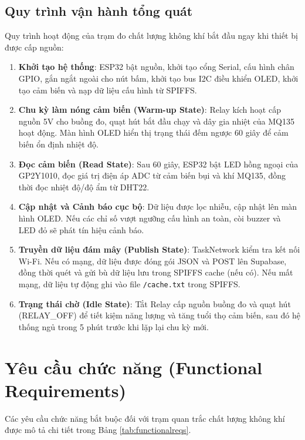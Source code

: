 \subsection{Quy trình vận hành tổng quát}
Quy trình hoạt động của trạm đo chất lượng không khí bắt đầu ngay khi thiết bị được cấp nguồn:
\begin{enumerate}
    \item \textbf{Khởi tạo hệ thống}: ESP32 bật nguồn, khởi tạo cổng Serial, cấu hình chân GPIO, gắn ngắt ngoài cho nút bấm, khởi tạo bus I2C điều khiển OLED, khởi tạo cảm biến và nạp dữ liệu cấu hình từ SPIFFS.
    \item \textbf{Chu kỳ làm nóng cảm biến (Warm-up State)}: Relay kích hoạt cấp nguồn 5V cho buồng đo, quạt hút bắt đầu chạy và dây gia nhiệt của MQ135 hoạt động. Màn hình OLED hiển thị trạng thái đếm ngược 60 giây để cảm biến ổn định nhiệt độ.
    \item \textbf{Đọc cảm biến (Read State)}: Sau 60 giây, ESP32 bật LED hồng ngoại của GP2Y1010, đọc giá trị điện áp ADC từ cảm biến bụi và khí MQ135, đồng thời đọc nhiệt độ/độ ẩm từ DHT22.
    \item \textbf{Cập nhật và Cảnh báo cục bộ}: Dữ liệu được lọc nhiễu, cập nhật lên màn hình OLED. Nếu các chỉ số vượt ngưỡng cấu hình an toàn, còi buzzer và LED đỏ sẽ phát tín hiệu cảnh báo.
    \item \textbf{Truyền dữ liệu đám mây (Publish State)}: TaskNetwork kiểm tra kết nối Wi-Fi. Nếu có mạng, dữ liệu được đóng gói JSON và POST lên Supabase, đồng thời quét và gửi bù dữ liệu lưu trong SPIFFS cache (nếu có). Nếu mất mạng, dữ liệu tự động ghi vào file \texttt{/cache.txt} trong SPIFFS.
    \item \textbf{Trạng thái chờ (Idle State)}: Tắt Relay cấp nguồn buồng đo và quạt hút (RELAY\_OFF) để tiết kiệm năng lượng và tăng tuổi thọ cảm biến, sau đó hệ thống ngủ trong 5 phút trước khi lặp lại chu kỳ mới.
\end{enumerate}

\section{Yêu cầu chức năng (Functional Requirements)}
Các yêu cầu chức năng bắt buộc đối với trạm quan trắc chất lượng không khí được mô tả chi tiết trong Bảng \ref{tab:functionalreqs}.

